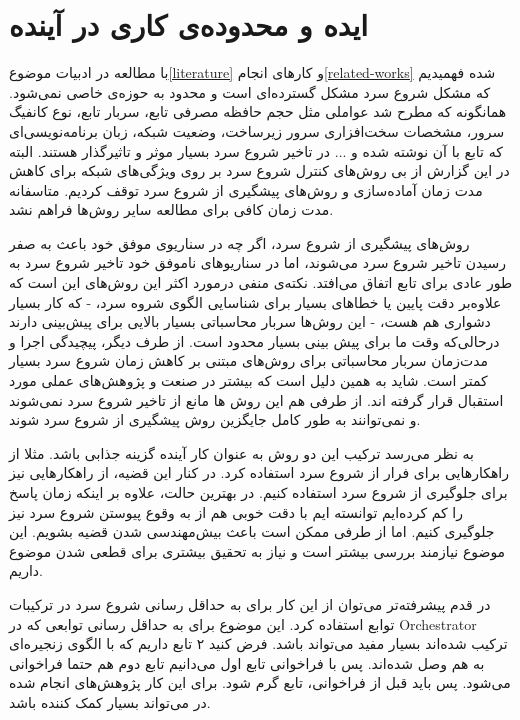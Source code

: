 \label{conclusion}

\section{ایده و محدوده‌ی کاری در آینده}

با مطالعه در ادبیات موضوع\ref{literature} و کارهای انجام\ref{related-works}  شده فهمیدیم که مشکل شروع سرد مشکل گسترده‌ای است و محدود به حوزه‌ی خاصی نمی‌شود. همانگونه که مطرح شد عواملی مثل حجم حافظه مصرفی تابع، سربار تابع، نوع کانفیگ سرور، مشخصات سخت‌افزاری سرور زیرساخت، وضعیت شبکه، زبان برنامه‌نویسی‌ای که تابع با آن نوشته شده و ... در تاخیر شروع سرد بسیار موثر و تاثیرگذار هستند. البته در این گزارش از بی روش‌های کنترل شروع سرد بر روی ویژگی‌های شبکه برای کاهش مدت زمان آماده‌سازی و روش‌های پیشگیری از شروع سرد توقف کردیم. متاسفانه مدت زمان کافی برای مطالعه سایر روش‌ها فراهم نشد. 

روش‌های پیشگیری از شروع سرد، اگر چه در سناریوی موفق خود باعث به صفر رسیدن تاخیر شروع سرد می‌شوند، اما در سناریوهای ناموفق خود تاخیر شروع سرد به طور عادی برای تابع اتفاق می‌افتد. نکته‌ی منفی درمورد اکثر این روش‌های این است که علاوه‌بر دقت پایین یا خطا‌های بسیار برای شناسایی الگوی شروه سرد، - که کار بسیار دشواری هم هست، - این روش‌ها سربار محاسباتی بسیار بالایی برای پیش‌بینی دارند درحالی‌که وقت ما برای پیش بینی بسیار محدود است. از طرف دیگر، پیچیدگی اجرا و مدت‌زمان سربار محاسباتی برای روش‌های مبتنی بر کاهش زمان شروع سرد بسیار کمتر است. شاید به همین دلیل است که بیشتر در صنعت و پژوهش‌های عملی مورد استقبال قرار گرفته اند. از طرفی هم این روش ها مانع از تاخیر شروع سرد نمی‌شوند و نمی‌توانند به طور کامل جایگزین روش پیشگیری از شروع سرد شوند. 

به نظر می‌رسد ترکیب این دو روش به عنوان کار آینده گزینه جذابی باشد. مثلا از راهکار‌هایی برای فرار از شروع سرد استفاده کرد. در کنار این قضیه، از راهکارهایی نیز برای جلوگیری از شروع سرد استفاده کنیم. در بهترین حالت، علاوه بر اینکه زمان پاسخ را کم کرده‌ایم توانسته ایم با دقت خوبی هم از به وقوع پیوستن شروع سرد نیز جلوگیری کنیم. اما از طرفی ممکن است باعث بیش‌مهندسی شدن قضیه بشویم. این موضوع نیازمند بررسی بیشتر است و نیاز به تحقیق بیشتری برای قطعی شدن موضوع داریم. 

در قدم پیشرفته‌تر می‌توان از این کار برای به حداقل رسانی شروع سرد در ترکیبات توابع استفاده کرد. این موضوع برای به حداقل رسانی توابعی که در Orchestrator ترکیب شده‌اند بسیار مفید می‌تواند باشد. فرض کنید ۲ تابع داریم که با الگوی زنجیره‌ای به هم وصل شده‌اند. پس با فراخوانی تابع اول می‌دانیم تابع دوم هم حتما فراخوانی می‌شود. پس باید قبل از فراخوانی، تابع گرم شود. برای این کار پژوهش‌های انجام شده در \cite{mohan2019agile, lin2019mitigating} می‌تواند بسیار کمک کننده باشد. 

